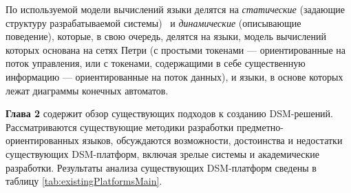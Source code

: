 По используемой модели вычислений языки делятся на \textit{статические} (задающие структуру разрабатываемой системы) \
и \textit{динамические} (описывающие поведение), которые, в свою очередь, делятся на языки, 
модель вычислений которых основана на сетях Петри (с простыми токенами --- ориентированные на поток управления,
или с токенами, содержащими в себе существенную информацию --- ориентированные на поток данных),
и языки, в основе которых лежат диаграммы конечных автоматов.

\textbf{Глава 2} содержит обзор существующих подходов к созданию DSM-решений. 
Рассматриваются существующие методики разработки предметно-ориентированных языков,
обсуждаются возможности, достоинства и недостатки существующих DSM-платформ, 
включая зрелые системы и академические разработки. Результаты анализа существующих 
DSM-платформ сведены в таблицу \ref{tab:existingPlatformsMain}.


